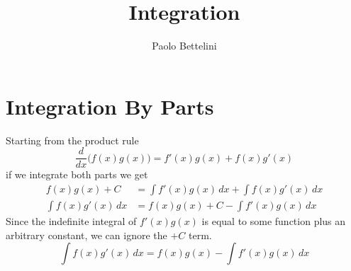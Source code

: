 \documentclass{article}
\title{Integration}
\author{Paolo Bettelini}
\date{}
\begin{document}
\maketitle
\tableofcontents
\pagebreak

\section{Integration By Parts}

Starting from the product rule
\[
    \frac{d}{dx}\big(f(x)g(x)\big)=f'(x)g(x)+f(x)g'(x)
\]
if we integrate both parts we get
\begin{align*}
    f(x)g(x)+C&=\int f'(x)g(x)\,dx+\int f(x)g'(x)\,dx \\
    \int f(x)g'(x)\,dx &= f(x)g(x)+C - \int f'(x)g(x)\,dx 
\end{align*}
Since the indefinite integral of \(f'(x)g(x)\) is equal to some function plus an arbitrary constant, we can ignore the \(+C\) term.
\[
    \int f(x)g'(x)\,dx = f(x)g(x) - \int f'(x)g(x)\,dx
\]

\pagebreak
\end{document}
